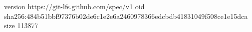 version https://git-lfs.github.com/spec/v1
oid sha256:484b51bbf97376b02de6c1e2e6a2460978366edcbdb41831049f508ce1e15dca
size 113877

